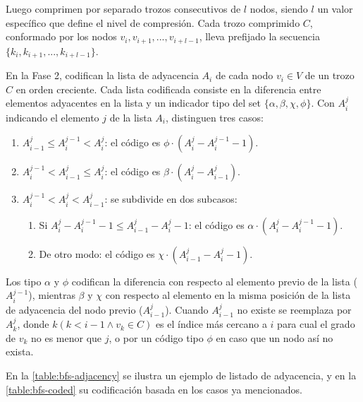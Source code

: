

Luego comprimen por separado trozos consecutivos de $l$ nodos, siendo $l$ un valor específico que define el nivel de compresión. Cada trozo comprimido $C$, conformado por los nodos $v_{i}, v_{i + 1}, ..., v_{i + l - 1}$, lleva prefijado la secuencia $\{k_{i}, k_{i + 1}, ..., k_{i + l - 1}\}$.

En la Fase 2, codifican la lista de adyacencia $A_{i}$ de cada nodo $v_{i} \in V$ de un trozo $C$ en orden creciente. Cada lista codificada consiste en la diferencia entre elementos adyacentes en la lista y un indicador tipo del set $\{\alpha, \beta, \chi, \phi\}$. Con $A_{i}^{j}$ indicando el elemento $j$ de la lista $A_{i}$, distinguen tres casos:

\begin{enumerate}
	\item $A_{i - 1}^{j} \leq A_{i}^{j - 1} < A_{i}^{j}$: el código es $\phi \cdot (A_{i}^{j} - A_{i}^{j - 1} - 1)$.
	\item $A_{i}^{j - 1} < A_{i - 1}^{j} \leq A_{i}^{j}$: el código es $\beta \cdot (A_{i}^{j} - A_{i - 1}^{j})$.
	\item $A_{i}^{j - 1} < A_{i}^{j} < A_{i - 1}^{j}$: se subdivide en dos subcasos:
	\begin{enumerate}
		\item Si $A_{i}^{j} - A_{i}^{j - 1} - 1 \leq A_{i - 1}^{j} - A_{i}^{j} - 1$: el código es $\alpha \cdot (A_{i}^{j} - A_{i}^{j - 1} - 1)$.
		\item De otro modo: el código es $\chi \cdot (A_{i - 1}^{j} - A_{i}^{j} - 1)$.
	\end{enumerate}
\end{enumerate}

Los tipo $\alpha$ y $\phi$ codifican la diferencia con respecto al elemento previo de la lista ($A_{i}^{j - 1}$), mientras $\beta$ y $\chi$ con respecto al elemento en la misma posición de la lista de adyacencia del nodo previo ($A_{i - 1}^{j}$). Cuando $A_{i - 1}^{j}$ no existe se reemplaza por $A_{k}^{j}$, donde $k (k < i - 1 \wedge v_{k} \in C)$ es el índice más cercano a $i$ para cual el grado de $v_{k}$ no es menor que $j$, o por un código tipo $\phi$ en caso que un nodo así no exista.

En la \autoref{table:bfs-adjacency} se ilustra un ejemplo de listado de adyacencia, y en la \autoref{table:bfs-coded} su codificación basada en los casos ya mencionados.



